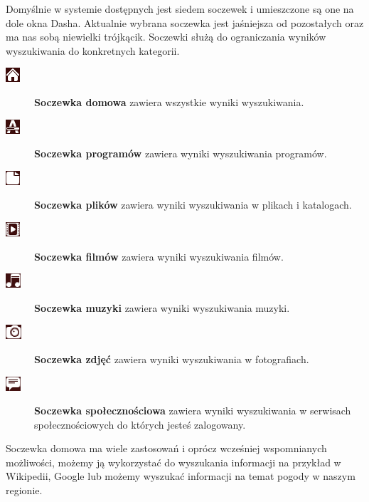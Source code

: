 Domyślnie w systemie dostępnych jest siedem soczewek i umieszczone są one na dole okna Dasha. Aktualnie wybrana soczewka jest jaśniejsza od pozostałych oraz ma nas sobą niewielki trójkącik. Soczewki służą do ograniczania wyników wyszukiwania do konkretnych kategorii.
\begin{description}
\item[\includegraphics{images/unity_dash_lens_home.png}] \textbf{Soczewka domowa} zawiera wszystkie wyniki wyszukiwania. 
\item[\includegraphics{images/unity_dash_lens_programy.png}] \textbf{Soczewka programów} zawiera wyniki wyszukiwania programów.
\item[\includegraphics{images/unity_dash_lens_pliki.png}] \textbf{Soczewka plików} zawiera wyniki wyszukiwania w plikach i katalogach.
\item[\includegraphics{images/unity_dash_lens_video.png}] \textbf{Soczewka filmów} zawiera wyniki wyszukiwania filmów.
\item[\includegraphics{images/unity_dash_lens_audio.png}] \textbf{Soczewka muzyki} zawiera wyniki wyszukiwania muzyki.
\item[\includegraphics{images/unity_dash_lens_photo.png}] \textbf{Soczewka zdjęć} zawiera wyniki wyszukiwania w fotografiach.
\item[\includegraphics{images/unity_dash_lens_social.png}] \textbf{Soczewka społecznościowa} zawiera wyniki wyszukiwania w serwisach społecznościowych do których jesteś zalogowany.
\end{description}
\clearpage
Soczewka domowa ma wiele zastosowań i oprócz wcześniej wspomnianych możliwości, możemy ją wykorzystać do wyszukania informacji na przykład w Wikipedii, Google lub możemy wyszukać informacji na temat pogody w naszym regionie.
